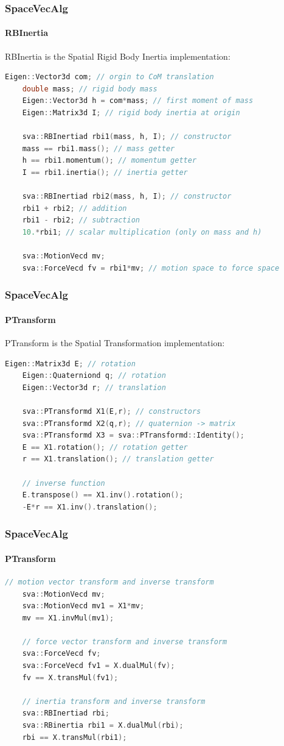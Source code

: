\documentclass{beamer}
\begin{document}
\begin{frame}[fragile]
\frametitle{SpaceVecAlg}
\framesubtitle{RBInertia}
RBInertia is the Spatial Rigid Body Inertia implementation:
\begin{lstlisting}[language=C++]
	Eigen::Vector3d com; // orgin to CoM translation
	double mass; // rigid body mass
	Eigen::Vector3d h = com*mass; // first moment of mass
	Eigen::Matrix3d I; // rigid body inertia at origin

	sva::RBInertiad rbi1(mass, h, I); // constructor
	mass == rbi1.mass(); // mass getter
	h == rbi1.momentum(); // momentum getter
	I == rbi1.inertia(); // inertia getter

	sva::RBInertiad rbi2(mass, h, I); // constructor
	rbi1 + rbi2; // addition
	rbi1 - rbi2; // subtraction
	10.*rbi1; // scalar multiplication (only on mass and h)

	sva::MotionVecd mv;
	sva::ForceVecd fv = rbi1*mv; // motion space to force space
\end{lstlisting}
\end{frame}


\begin{frame}[fragile]
\frametitle{SpaceVecAlg}
\framesubtitle{PTransform}
PTransform is the Spatial Transformation implementation:
\begin{lstlisting}[language=C++]
	Eigen::Matrix3d E; // rotation
	Eigen::Quaterniond q; // rotation
	Eigen::Vector3d r; // translation

	sva::PTransformd X1(E,r); // constructors
	sva::PTransformd X2(q,r); // quaternion -> matrix
	sva::PTransformd X3 = sva::PTransformd::Identity();
	E == X1.rotation(); // rotation getter
	r == X1.translation(); // translation getter

	// inverse function
	E.transpose() == X1.inv().rotation();
	-E*r == X1.inv().translation();
\end{lstlisting}
\end{frame}
\begin{frame}[fragile]
\frametitle{SpaceVecAlg}
\framesubtitle{PTransform}
\begin{lstlisting}[language=C++]
	// motion vector transform and inverse transform
	sva::MotionVecd mv;
	sva::MotionVecd mv1 = X1*mv;
	mv == X1.invMul(mv1);

	// force vector transform and inverse transform
	sva::ForceVecd fv;
	sva::ForceVecd fv1 = X.dualMul(fv);
	fv == X.transMul(fv1);

	// inertia transform and inverse transform
	sva::RBInertiad rbi;
	sva::RBinertia rbi1 = X.dualMul(rbi);
	rbi == X.transMul(rbi1);
\end{lstlisting}
\end{frame}
\end{document}
